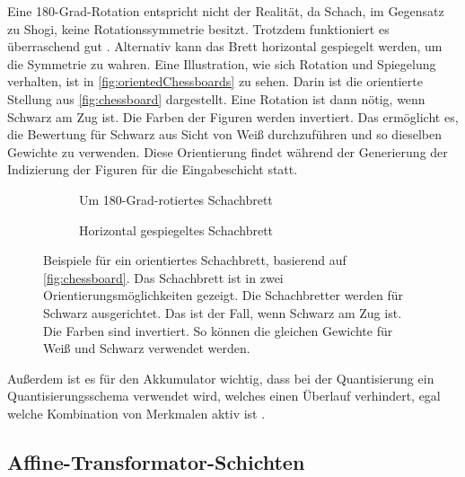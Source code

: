 Eine 180-Grad-Rotation entspricht nicht der Realität, da Schach, im Gegensatz zu Shogi, keine Rotationssymmetrie besitzt. Trotzdem funktioniert es überraschend gut \cite{StockfishNNUE}. Alternativ kann das Brett horizontal gespiegelt werden, um die Symmetrie zu wahren. Eine Illustration, wie sich Rotation und Spiegelung verhalten, ist in \autoref{fig:orientedChessboards} zu sehen. Darin ist die orientierte Stellung aus \autoref{fig:chessboard} dargestellt. Eine Rotation ist dann nötig, wenn Schwarz am Zug ist. Die Farben der Figuren werden invertiert. Das ermöglicht es, die Bewertung für Schwarz aus Sicht von Weiß durchzuführen und so dieselben Gewichte zu verwenden. Diese Orientierung findet während der Generierung der Indizierung der Figuren für die Eingabeschicht statt.

\begin{figure}
  \centering
  \begin{subfigure}{.5\textwidth}
    \centering
    \resizebox{.9\textwidth}{!}{%
      \chessboard[setfen={8/8/6k1/5N2/3p4/8/3K4/8 b}]
    }
    \caption{Um 180-Grad-rotiertes Schachbrett}
    \label{fig:rotatedChessboard}
  \end{subfigure}%
  \begin{subfigure}{.5\textwidth}
    \centering
    \resizebox{.9\textwidth}{!}{%
      \chessboard[setfen={8/8/1k6/2N5/4p3/8/4K3/8 b}]
    }
    \caption{Horizontal gespiegeltes Schachbrett}
    \label{fig:flippedChessboard}
  \end{subfigure}
  \caption{Beispiele für ein orientiertes Schachbrett, basierend auf \autoref{fig:chessboard}. Das Schachbrett ist in zwei Orientierungsmöglichkeiten gezeigt. Die Schachbretter werden für Schwarz ausgerichtet. Das ist der Fall, wenn Schwarz am Zug ist. Die Farben sind invertiert. So können die gleichen Gewichte für Weiß und Schwarz verwendet werden.}
  \label{fig:orientedChessboards}
\end{figure}

Außerdem ist es für den Akkumulator wichtig, dass bei der Quantisierung ein Quantisierungsschema verwendet wird, welches einen Überlauf verhindert, egal welche Kombination von Merkmalen aktiv ist \cite{StockfishNNUE}.

\subsection{Affine-Transformator-Schichten}

